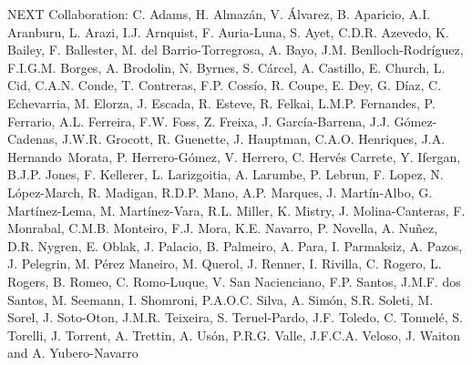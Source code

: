 NEXT Collaboration: C. Adams, H. Almaz\'an, V. \'Alvarez, B. Aparicio, A.I. Aranburu, L. Arazi, I.J. Arnquist, F. Auria-Luna, S. Ayet, C.D.R. Azevedo, K. Bailey, F. Ballester, M. del Barrio-Torregrosa, A. Bayo, J.M. Benlloch-Rodr\'{i}guez, F.I.G.M. Borges, A. Brodolin, N. Byrnes, S. C\'arcel, A. Castillo, E. Church, L. Cid, C.A.N. Conde, T. Contreras, F.P. Coss\'io, R. Coupe, E. Dey, G. D\'iaz, C. Echevarria, M. Elorza, J. Escada, R. Esteve, R. Felkai, L.M.P. Fernandes, P. Ferrario, A.L. Ferreira, F.W. Foss, Z. Freixa, J. Garc\'ia-Barrena, J.J. G\'omez-Cadenas, J.W.R. Grocott, R. Guenette, J. Hauptman, C.A.O. Henriques, J.A. Hernando~Morata, P. Herrero-G\'omez, V. Herrero, C. Herv\'es Carrete, Y. Ifergan, B.J.P. Jones, F. Kellerer, L. Larizgoitia, A. Larumbe, P. Lebrun, F. Lopez, N. L\'opez-March, R. Madigan, R.D.P. Mano, A.P. Marques, J. Mart\'in-Albo, G. Mart\'inez-Lema, M. Mart\'inez-Vara, R.L. Miller, K. Mistry, J. Molina-Canteras, F. Monrabal, C.M.B. Monteiro, F.J. Mora, K.E. Navarro, P. Novella, A. Nu\~{n}ez, D.R. Nygren, E. Oblak, J. Palacio, B. Palmeiro, A. Para, I. Parmaksiz, A. Pazos, J. Pelegrin, M. P\'erez Maneiro, M. Querol, J. Renner, I. Rivilla, C. Rogero, L. Rogers, B. Romeo, C. Romo-Luque, V. San Nacienciano, F.P. Santos, J.M.F. dos Santos, M. Seemann, I. Shomroni, P.A.O.C. Silva, A. Sim\'on, S.R. Soleti, M. Sorel, J. Soto-Oton, J.M.R. Teixeira, S. Teruel-Pardo, J.F. Toledo, C. Tonnel\'e, S. Torelli, J. Torrent, A. Trettin, A. Us\'on, P.R.G. Valle, J.F.C.A. Veloso, J. Waiton and A. Yubero-Navarro